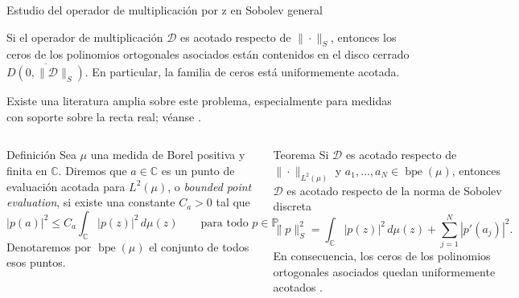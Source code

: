 \documentclass[aspectratio=169,10pt]{beamer}
\newcommand{\C}{\mathbb{C}}
\newcommand{\Poly}{\mathbb{P}}
\newcommand{\D}{\mathcal{D}}
\begin{document}
\begin{frame}{Estudio del operador de multiplicación por z en Sobolev general}
  \scriptsize
  \setlength{\abovedisplayskip}{2.5pt}
  \setlength{\belowdisplayskip}{2.5pt}
  \setlength{\abovedisplayshortskip}{1.5pt}
  \setlength{\belowdisplayshortskip}{1.5pt}

  Si el operador de multiplicación \(\D\) es acotado respecto de \(\|\cdot\|_S\),
  entonces los ceros de los polinomios ortogonales asociados están contenidos en el
  disco cerrado \(\overline{D(0,\|\D\|_S)}\). En particular, la familia de ceros está
  uniformemente acotada.

  Existe una literatura amplia sobre este problema, especialmente para medidas con
  soporte sobre la recta real; véanse
  \cite{AMRR92,ALR96,AlfRez01,Mei93,GK97,lopez1999zero,lopez2001sobolev}.

  \vspace{0.4mm}
  \begin{columns}[T,onlytextwidth]
    \begin{block}{Definición}
      Sea \(\mu\) una medida de Borel positiva y finita en \(\C\). Diremos que
      \(a\in\C\) es un punto de evaluación acotada para \(L^2(\mu)\), o
      \emph{bounded point evaluation}, si existe una constante \(C_a>0\) tal que
      \[
        |p(a)|^2\le C_a \int_{\C}|p(z)|^2\,d\mu(z)
        \qquad \text{para todo }p\in\Poly.
      \]
      Denotaremos por \(\operatorname{bpe}(\mu)\) el conjunto de todos esos puntos.
    \end{block}

    \vspace{-1.2mm}

    \begin{block}{Teorema}
      Si \(\D\) es acotado respecto de \(\|\cdot\|_{L^2(\mu)}\) y
      \(a_1,\dots,a_N\in\operatorname{bpe}(\mu)\), entonces \(\D\) es acotado respecto de la norma de Sobolev discreta
      \[
        \|p\|_S^2=\int_{\C}|p(z)|^2\,d\mu(z)+\sum_{j=1}^N |p'(a_j)|^2.
      \]
      En consecuencia, los ceros de los polinomios ortogonales asociados quedan uniformemente acotados {\scriptsize \cite{EG25-2}.}
    \end{block}


\end{columns}
\end{frame}
\end{document}
